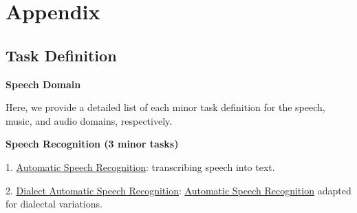 \newpage
\onecolumn
\section{Appendix}
\label{sec:appendix}







\subsection{Task Definition}\label{appendix:task_definition}
\begin{center}
\textbf{Speech Domain}
\end{center}

Here, we provide a detailed list of each minor task definition for the speech, music, and audio domains, respectively.

\textbf{Speech Recognition (3 minor tasks)}

1. \underline{Automatic Speech Recognition}: transcribing speech into text.

2. \underline{Dialect Automatic Speech Recognition}: \underline{Automatic Speech Recognition} adapted for dialectal variations.


